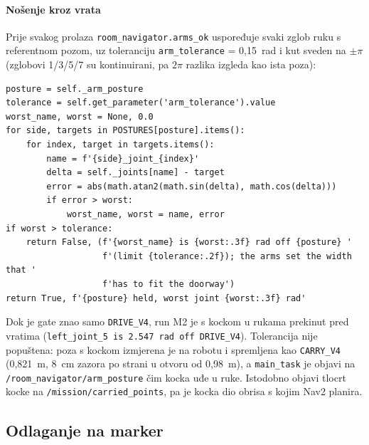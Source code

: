 \paragraph{Nošenje kroz vrata} Prije svakog prolaza \texttt{room\_navigator.arms\_ok} uspoređuje svaki
zglob ruku s referentnom pozom, uz toleranciju \texttt{arm\_tolerance} = 0{,}15~rad i kut sveden na
$\pm\pi$ (zglobovi 1/3/5/7 su kontinuirani, pa $2\pi$ razlika izgleda kao ista poza):

\begin{lstlisting}[style=code-python, caption={Gate ruku pred vratima (\texttt{room\_navigator.py}, redci 305--325): usporedba sa živom referentnom pozom, ne fiksnim \texttt{DRIVE\_V4}}, label={lst:room-navigator-gate}]
posture = self._arm_posture
tolerance = self.get_parameter('arm_tolerance').value
worst_name, worst = None, 0.0
for side, targets in POSTURES[posture].items():
    for index, target in targets.items():
        name = f'{side}_joint_{index}'
        delta = self._joints[name] - target
        error = abs(math.atan2(math.sin(delta), math.cos(delta)))
        if error > worst:
            worst_name, worst = name, error
if worst > tolerance:
    return False, (f'{worst_name} is {worst:.3f} rad off {posture} '
                   f'(limit {tolerance:.2f}); the arms set the width that '
                   f'has to fit the doorway')
return True, f'{posture} held, worst joint {worst:.3f} rad'
\end{lstlisting}

Dok je gate znao samo \texttt{DRIVE\_V4}, run M2 je s kockom u rukama prekinut pred vratima
(\texttt{left\_joint\_5 is 2.547 rad off DRIVE\_V4}).
Tolerancija nije popuštena: poza s kockom izmjerena je na robotu i spremljena kao \texttt{CARRY\_V4}
(0{,}821~m, 8~cm zazora po strani u otvoru od 0{,}98~m), a \texttt{main\_task} je objavi na
\texttt{/room\_navigator/arm\_posture} čim kocka uđe u ruke. Istodobno objavi tlocrt kocke na
\texttt{/mission/carried\_points}, pa je kocka dio obrisa s kojim Nav2 planira.


\subsection{Odlaganje na marker}
\label{sec:08-odlaganje}

